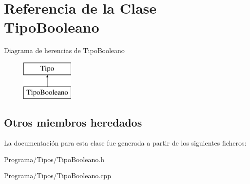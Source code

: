 \hypertarget{class_tipo_booleano}{\section{Referencia de la Clase Tipo\-Booleano}
\label{class_tipo_booleano}
}
Diagrama de herencias de Tipo\-Booleano\begin{figure}[H]
\begin{center}
\leavevmode
\includegraphics[height=2.000000cm]{class_tipo_booleano}
\end{center}
\end{figure}
\subsection*{Otros miembros heredados}


La documentación para esta clase fue generada a partir de los siguientes ficheros\-:\begin{DoxyCompactItemize}
\item 
Programa/\-Tipos/Tipo\-Booleano.\-h\item 
Programa/\-Tipos/Tipo\-Booleano.\-cpp\end{DoxyCompactItemize}
